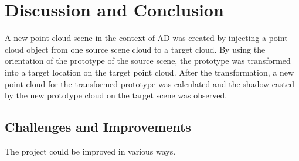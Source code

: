 \chapter{Discussion and Conclusion}
A new point cloud scene in the context of AD was created by injecting a point cloud object from one source scene cloud to a target cloud. By using the orientation of the prototype of the source scene, the prototype was transformed into a target location on the target point cloud. After the transformation, a new point cloud for the transformed prototype was calculated and the shadow casted by the new prototype cloud on the target scene was observed.
\section{Challenges and Improvements}
The project could be improved in various ways.
